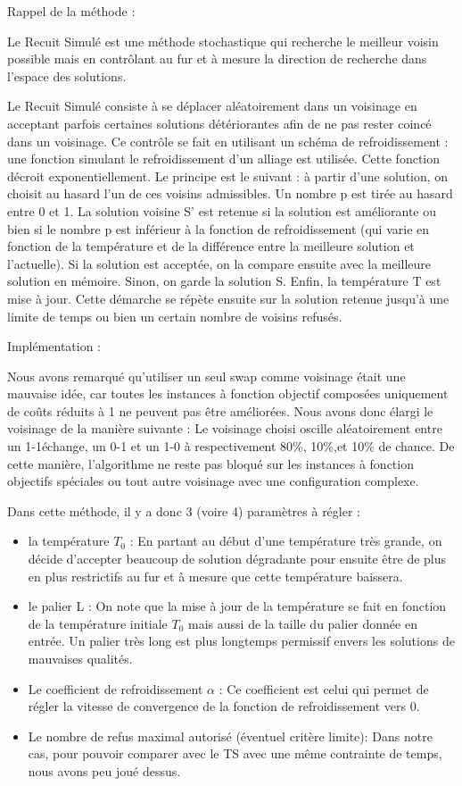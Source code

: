 Rappel de la méthode :

Le Recuit Simulé est une méthode stochastique qui recherche le meilleur voisin possible mais en contrôlant au fur et à mesure la direction de recherche dans l'espace des solutions.

Le Recuit Simulé consiste à se déplacer aléatoirement dans un voisinage en acceptant parfois certaines solutions détériorantes afin de ne pas rester coincé dans un voisinage. Ce contrôle se fait en utilisant un schéma de refroidissement : une fonction simulant le refroidissement d'un alliage est utilisée. Cette fonction décroit exponentiellement.
Le principe est le suivant : à partir d'une solution, on choisit au hasard l'un de ces voisins admissibles. Un nombre p est tirée au hasard entre 0 et 1. La solution voisine S' est retenue si la solution est améliorante ou bien si le nombre p est inférieur à la fonction de refroidissement (qui varie en fonction de la température et de la différence entre la meilleure solution et l'actuelle). Si la solution est acceptée, on la compare ensuite avec la meilleure solution en mémoire. Sinon, on garde la solution S. Enfin, la température T est mise à jour. Cette démarche se répète ensuite sur la solution retenue jusqu'à une limite de temps ou bien un certain nombre de voisins refusés.

Implémentation :

Nous avons remarqué qu'utiliser un seul swap comme voisinage était une mauvaise idée, car toutes les instances à fonction objectif composées uniquement de coûts réduits à 1 ne peuvent pas être améliorées. Nous avons donc élargi le voisinage de la manière suivante :
Le voisinage choisi oscille aléatoirement entre un 1-1échange, un 0-1 et un 1-0 à respectivement 80\%, 10\%,et 10\% de chance.
De cette manière, l'algorithme ne reste pas bloqué sur les instances à fonction objectifs spéciales ou tout autre voisinage avec une configuration complexe.


Dans cette méthode, il y a donc 3 (voire 4) paramètres à régler :
\begin{itemize}
    \item la température $ T_0 $ : En partant au début d'une température très grande, on décide d'accepter beaucoup de solution dégradante pour ensuite être de plus en plus restrictifs au fur et à mesure que cette température baissera.
    \item le palier L : On note que la mise à jour de la température se fait en fonction de la température initiale $ T_0 $ mais aussi de la taille du palier donnée en entrée. Un palier très long est plus longtemps permissif envers les solutions de mauvaises qualités.
    \item Le coefficient de refroidissement $ \alpha $ : Ce coefficient est celui qui permet de régler la vitesse de convergence de la fonction de refroidissement vers 0. 
    \item Le nombre de refus maximal autorisé (éventuel critère limite): Dans notre cas, pour pouvoir comparer avec le TS avec une même contrainte de temps, nous avons peu joué dessus.
\end{itemize}


